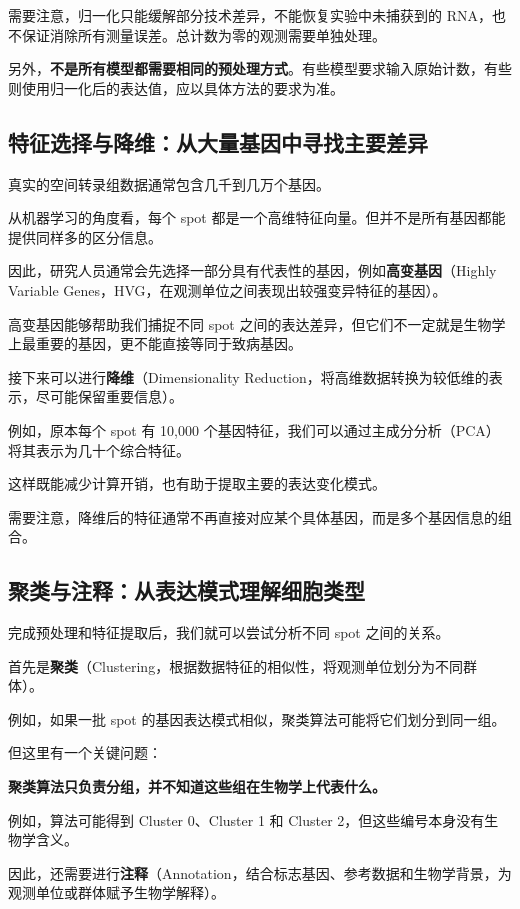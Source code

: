 \documentclass[UTF8,a4paper,11pt,fontset=fandol]{ctexart}
\newcommand{\term}[2]{{\color{accent}\textbf{#1}}（#2）}
\begin{document}
需要注意，归一化只能缓解部分技术差异，不能恢复实验中未捕获到的 RNA，也不保证消除所有测量误差。总计数为零的观测需要单独处理。

另外，\textbf{不是所有模型都需要相同的预处理方式}。有些模型要求输入原始计数，有些则使用归一化后的表达值，应以具体方法的要求为准。

\subsection{特征选择与降维：从大量基因中寻找主要差异}

真实的空间转录组数据通常包含几千到几万个基因。

从机器学习的角度看，每个 spot 都是一个高维特征向量。但并不是所有基因都能提供同样多的区分信息。

因此，研究人员通常会先选择一部分具有代表性的基因，例如\term{高变基因}{Highly Variable Genes，HVG，在观测单位之间表现出较强变异特征的基因}。

高变基因能够帮助我们捕捉不同 spot 之间的表达差异，但它们不一定就是生物学上最重要的基因，更不能直接等同于致病基因。

接下来可以进行\term{降维}{Dimensionality Reduction，将高维数据转换为较低维的表示，尽可能保留重要信息}。

例如，原本每个 spot 有 10,000 个基因特征，我们可以通过主成分分析（PCA）将其表示为几十个综合特征。

这样既能减少计算开销，也有助于提取主要的表达变化模式。

需要注意，降维后的特征通常不再直接对应某个具体基因，而是多个基因信息的组合。

\subsection{聚类与注释：从表达模式理解细胞类型}

完成预处理和特征提取后，我们就可以尝试分析不同 spot 之间的关系。

首先是\term{聚类}{Clustering，根据数据特征的相似性，将观测单位划分为不同群体}。

例如，如果一批 spot 的基因表达模式相似，聚类算法可能将它们划分到同一组。

但这里有一个关键问题：

\textbf{聚类算法只负责分组，并不知道这些组在生物学上代表什么。}

例如，算法可能得到 Cluster 0、Cluster 1 和 Cluster 2，但这些编号本身没有生物学含义。

因此，还需要进行\term{注释}{Annotation，结合标志基因、参考数据和生物学背景，为观测单位或群体赋予生物学解释}。
\end{document}

